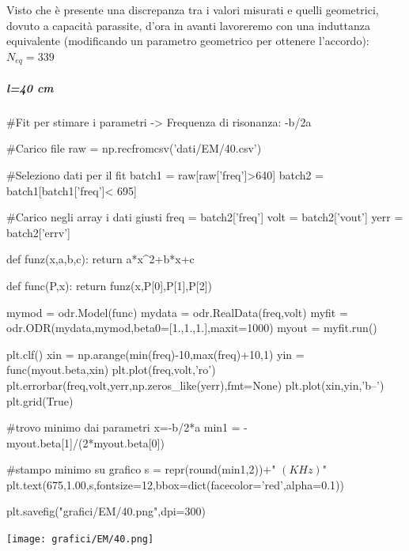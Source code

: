 Visto che è presente una discrepanza tra i valori misurati e quelli geometrici, dovuto a capacità parassite, d'ora in avanti lavoreremo con una induttanza equivalente (modificando un parametro geometrico per ottenere l'accordo): $N_{eq} = 339$

\subparagraph*{l=40 cm}

\begin{sagesilent}

 #Fit per stimare i parametri -> Frequenza di risonanza: -b/2a

#Carico file
raw = np.recfromcsv('dati/EM/40.csv')

#Seleziono dati per il fit
batch1 = raw[raw['freq']>640]
batch2 = batch1[batch1['freq']< 695]

#Carico negli array i dati giusti
freq = batch2['freq']
volt = batch2['vout']
yerr = batch2['errv']


def funz(x,a,b,c):
    return a*x^2+b*x+c

def func(P,x):
    return funz(x,P[0],P[1],P[2])

mymod = odr.Model(func)
mydata = odr.RealData(freq,volt)
myfit = odr.ODR(mydata,mymod,beta0=[1.,1.,1.],maxit=1000)
myout = myfit.run()

plt.clf()
xin = np.arange(min(freq)-10,max(freq)+10,1)
yin = func(myout.beta,xin)
plt.plot(freq,volt,'ro')
plt.errorbar(freq,volt,yerr,np.zeros_like(yerr),fmt=None)
plt.plot(xin,yin,'b--')
plt.grid(True)

#trovo minimo dai parametri x=-b/2*a
min1 = -myout.beta[1]/(2*myout.beta[0]) 

#stampo minimo su grafico
s = repr(round(min1,2))+" $(KHz)$"
plt.text(675,1.00,s,fontsize=12,bbox=dict(facecolor='red',alpha=0.1))

plt.savefig("grafici/EM/40.png",dpi=300)
 
\end{sagesilent}

\texttt{[image: grafici/EM/40.png]}

